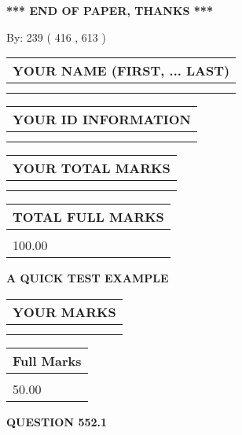 \documentclass[12pt]{article}
\begin{document}
\vspace{1.0in} 
{\textbf{\large{ *** END OF PAPER, THANKS *** }}} 
   
   
\hspace{1.0in} By: 
 239 ( 416 ,  613 )
   
   
   
   
\newpage 
\setcounter{page}{ 
   552001 } 
   
   
   
   
\noindent\begin{tabular}{|l|}
\hline
YOUR NAME (FIRST, ... LAST)  \\
\hline
 \\ 
 \\ 
\hline
\end{tabular}
\hspace{0.05in} \begin{tabular}{|l|}
\hline
 YOUR   ID   INFORMATION  \\
\hline
 \\ 
 \\ 
\hline
\end{tabular}
   
   
\vspace{0.2in}\noindent\begin{tabular}{|l|}
\hline
YOUR TOTAL MARKS  \\
\hline
 \\ 
 \\ 
\hline
\end{tabular}
\hspace{0.05in} \begin{tabular}{|l|}
\hline
TOTAL FULL MARKS  \\
\hline
 \\ 
100.00 \\
\hline
\end{tabular}
   
   
 \vspace{0.2in}
{\LARGE {\textbf{ A QUICK TEST EXAMPLE}}}
   
   
  
\vspace{0.2in}
  
\noindent\begin{tabular}{|l|}
\hline
 YOUR MARKS  \\
\hline
 \\ 
 \\ 
\hline
\end{tabular}
\hspace{0.05in} \begin{tabular}{|l|}
\hline
 Full Marks  \\
\hline
 \\ 
50.00 \\
\hline
\end{tabular}
{\textbf{\Large{QUESTION
552.1 
}}}
  
\end{document}
